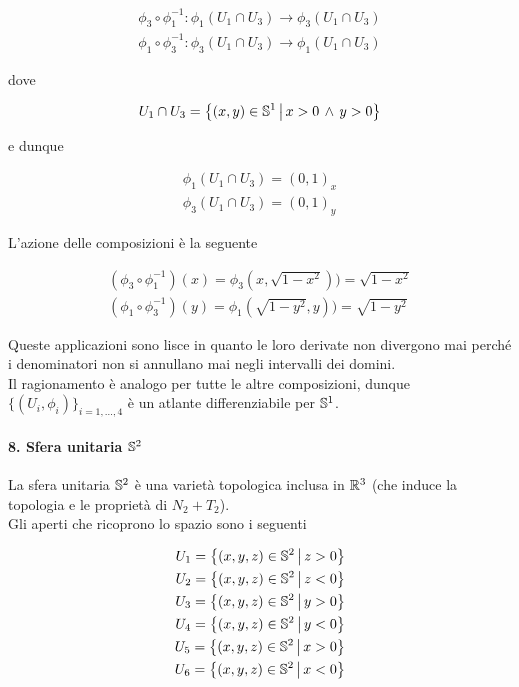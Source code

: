 \begin{gather}
	\phi_{3} \circ \phi_{1}^{-1} : \phi_{1}(U_{1} \cap U_{3}) \to \phi_{3}(U_{1} \cap U_{3})\\
	\phi_{1} \circ \phi_{3}^{-1} : \phi_{3}(U_{1} \cap U_{3}) \to \phi_{1}(U_{1} \cap U_{3})
\end{gather}

dove

\begin{equation}
	U_{1} \cap U_{3} = \left\{ (x,y) \in \S^{1} \st x>0 \, \wedge \, y>0  \right\}
\end{equation}

e dunque

\begin{gather}
	\phi_{1}(U_{1} \cap U_{3}) = (0,1)_{x}\\
	\phi_{3}(U_{1} \cap U_{3}) = (0,1)_{y}
\end{gather}

L'azione delle composizioni è la seguente

\begin{gather}
	(\phi_{3} \circ \phi_{1}^{-1}) (x) = \phi_{3} (x,\sqrt{1-x^{2}})) = \sqrt{1-x^{2}}\\
	(\phi_{1} \circ \phi_{3}^{-1}) (y) = \phi_{1} (\sqrt{1-y^{2}},y)) = \sqrt{1-y^{2}}
\end{gather}

Queste applicazioni sono lisce in quanto le loro derivate non divergono mai perché i denominatori non si annullano mai negli intervalli dei domini.\\
Il ragionamento è analogo per tutte le altre composizioni, dunque $ \{(U_{i},\phi_{i})\}_{i=1,\dots,4} $ è un atlante differenziabile per $ \S^{1} $.

\paragraph{8. Sfera unitaria $ \S^{2} $}\label{unit-sph}

La sfera unitaria $ \S^{2} $ è una varietà topologica inclusa in $ \R^{3} $ (che induce la topologia e le proprietà di $ N_{2}+T_{2} $).\\
Gli aperti che ricoprono lo spazio sono i seguenti

\begin{align}
	U_{1} = \left\{ (x,y,z) \in \S^{2} \st z>0 \right\}\\
	U_{2} = \left\{ (x,y,z) \in \S^{2} \st z<0 \right\}\\
	U_{3} = \left\{ (x,y,z) \in \S^{2} \st y>0 \right\}\\
	U_{4} = \left\{ (x,y,z) \in \S^{2} \st y<0 \right\}\\
	U_{5} = \left\{ (x,y,z) \in \S^{2} \st x>0 \right\}\\
	U_{6} = \left\{ (x,y,z) \in \S^{2} \st x<0 \right\}
\end{align}


